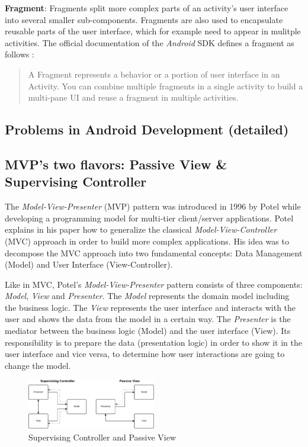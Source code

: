 \textbf{Fragment}: Fragments split more complex parts of an activity's user interface into several smaller sub-components. Fragments are also used to encapsulate reusable parts of the user interface, which for example need to appear in mulitple activities. The official documentation of the \emph{Android} SDK defines a fragment as follows \cite{SDKFragments}:

\begin{quote}
A Fragment represents a behavior or a portion of user interface in an Activity. You can combine multiple fragments in a single activity to build a multi-pane UI and reuse a fragment in multiple activities.
\end{quote}


\subsection{Problems in Android Development (detailed)}

\subsection{MVP's two flavors: Passive View \& Supervising Controller}

The \emph{Model-View-Presenter} (MVP) pattern was introduced in 1996 by Potel \cite{TaligentMVP} while developing a programming model for multi-tier client/server applications. Potel explains in his paper how to generalize the classical \emph{Model-View-Controller} (MVC) approach in order to build more complex applications. His idea was to decompose the MVC approach into two fundamental concepts: Data Management (Model) and User Interface (View-Controller).

Like in MVC, Potel's \emph{Model-View-Presenter} pattern consists of three components: \emph{Model}, \emph{View} and \emph{Presenter}. The \emph{Model} represents the domain model including the business logic. The \emph{View} represents the user interface and interacts with the user and shows the data from the model in a certain way. The \emph{Presenter} is the mediator between the business logic (Model) and the user interface (View). Its responsibility is to prepare the data (presentation logic) in order to show it in the user interface and vice versa, to determine how user interactions are going to change the model.

\begin{figure}[!t]
\centering
\includegraphics[width=0.5\textwidth]{Images/mvp}
\caption{Supervising Controller and Passive View}
\label{fig:mvp}
\end{figure}

